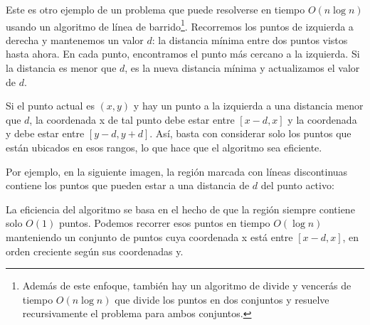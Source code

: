 Este es otro ejemplo de un problema
que puede resolverse en tiempo $O(n \log n)$
usando un algoritmo de línea de barrido\footnote{Además de este enfoque,
también hay un
algoritmo de divide y vencerás de tiempo $O(n \log n)$ \cite{sha75}
que divide los puntos en dos conjuntos y resuelve recursivamente
el problema para ambos conjuntos.}.
Recorremos los puntos de izquierda a derecha
y mantenemos un valor $d$: la distancia mínima
entre dos puntos vistos hasta ahora.
En cada punto, encontramos el punto más cercano a la izquierda.
Si la distancia es menor que $d$, es la
nueva distancia mínima y actualizamos
el valor de $d$.

Si el punto actual es $(x,y)$
y hay un punto a la izquierda
a una distancia menor que $d$,
la coordenada x de tal punto debe
estar entre $[x-d,x]$ y la coordenada y
debe estar entre $[y-d,y+d]$.
Así, basta con considerar solo los puntos
que están ubicados en esos rangos,
lo que hace que el algoritmo sea eficiente.

Por ejemplo, en la siguiente imagen, la
región marcada con líneas discontinuas contiene
los puntos que pueden estar a una distancia de $d$
del punto activo:

\begin{center}
\end{center}

La eficiencia del algoritmo se basa en el hecho
de que la región siempre contiene
solo $O(1)$ puntos.
Podemos recorrer esos puntos en tiempo $O(\log n)$
manteniendo un conjunto de puntos cuya coordenada x
está entre $[x-d,x]$, en orden creciente según
sus coordenadas y.

